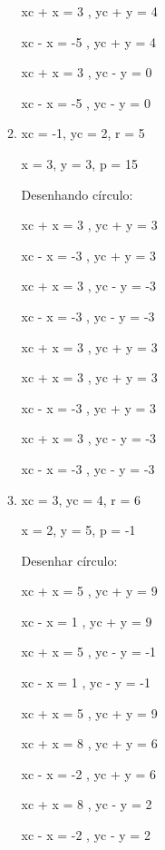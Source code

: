 \begin{enumerate}
\begin{enumerate}[label=\alph*. ]
                   xc + x = 3 , yc + y = 4
                   
                   xc - x = -5 , yc + y = 4
                   
                  xc + x = 3 , yc - y = 0
                  
                  xc - x = -5 , yc - y = 0
            
            \item 
			 xc = -1, yc = 2, r = 5            
            
            x = 3, y = 3, p = 15

               Desenhando círculo:
               
                  xc + x = 3 , yc + y = 3
                  
                  xc - x = -3 , yc + y = 3
                  
                  xc + x = 3 , yc - y = -3
                  
                  xc - x = -3 , yc - y = -3
                  
                  xc + x = 3 , yc + y = 3
                  
                  xc + x = 3 , yc + y = 3
                  
                  xc - x = -3 , yc + y = 3
                  
                  xc + x = 3 , yc - y = -3
                  
                  xc - x = -3 , yc - y = -3

            \item 
             xc = 3, yc = 4, r = 6
             
             x = 2, y = 5, p = -1
             
             Desenhar círculo:
             
					xc + x = 5 , yc + y = 9
					
					xc - x = 1 , yc + y = 9
					
					xc + x = 5 , yc - y = -1
					
					xc - x = 1 , yc - y = -1
					
					xc + x = 5 , yc + y = 9
					
					xc + x = 8 , yc + y = 6
					
					xc - x = -2 , yc + y = 6
					
					xc + x = 8 , yc - y = 2
					
					xc - x = -2 , yc - y = 2
                
		\end{enumerate}
		
	\end{enumerate}
